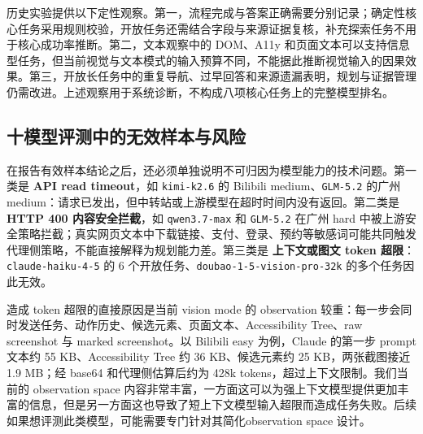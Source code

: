 历史实验提供以下定性观察。第一，流程完成与答案正确需要分别记录；确定性核心任务采用规则校验，开放任务还需结合字段与来源证据复核，补充探索任务不用于核心成功率推断。第二，文本观察中的 DOM、A11y 和页面文本可以支持信息型任务，但当前视觉与文本模式的输入预算不同，不能据此推断视觉输入的因果效果。第三，开放长任务中的重复导航、过早回答和来源遗漏表明，规划与证据管理仍需改进。上述观察用于系统诊断，不构成八项核心任务上的完整模型排名。

\subsection{十模型评测中的无效样本与风险}

在报告有效样本结论之后，还必须单独说明不可归因为模型能力的技术问题。第一类是 \textbf{API read timeout}，如 \texttt{kimi-k2.6} 的 Bilibili medium、\texttt{GLM-5.2} 的广州 medium：请求已发出，但中转站或上游模型在超时时间内没有返回。第二类是 \textbf{HTTP 400 内容安全拦截}，如 \texttt{qwen3.7-max} 和 \texttt{GLM-5.2} 在广州 hard 中被上游安全策略拦截；真实网页文本中下载链接、支付、登录、预约等敏感词可能共同触发代理侧策略，不能直接解释为规划能力差。第三类是 \textbf{上下文或图文 token 超限}：\texttt{claude-haiku-4-5} 的 6 个开放任务、\texttt{doubao-1-5-vision-pro-32k} 的多个任务因此无效。

造成 token 超限的直接原因是当前 vision mode 的 observation 较重：每一步会同时发送任务、动作历史、候选元素、页面文本、Accessibility Tree、raw screenshot 与 marked screenshot。以 Bilibili easy 为例，Claude 的第一步 prompt 文本约 55 KB、Accessibility Tree 约 36 KB、候选元素约 25 KB，两张截图接近 1.9 MB；经 base64 和代理侧估算后约为 428k tokens，超过上下文限制。我们当前的 observation space 内容非常丰富，一方面这可以为强上下文模型提供更加丰富的信息，但是另一方面这也导致了短上下文模型输入超限而造成任务失败。后续如果想评测此类模型，可能需要专门针对其简化observation space 设计。

